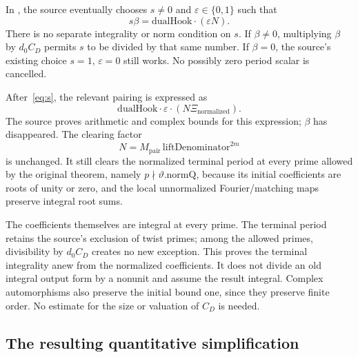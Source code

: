 In , the source eventually chooses $s\ne0$ and $\varepsilon\in\{0,1\}$ such that
\begin{equation}\label{eq:s}
 s\beta=\mathrm{dualHook}\cdot(\varepsilon N).
\end{equation}
There is no separate integrality or norm condition on $s$. If $\beta\ne0$, multiplying $\beta$ by $d_0C_D$ permits $s$ to be divided by that same number. If $\beta=0$, the source's existing choice $s=1$, $\varepsilon=0$ still works. No possibly zero period scalar is cancelled.

After~\eqref{eq:s}, the relevant pairing is expressed as
\[
 \mathrm{dualHook}\cdot\varepsilon\cdot(N\Xi_{\mathrm{normalized}}).
\]
The source proves arithmetic and complex bounds for this expression; $\beta$ has disappeared. The clearing factor
\[
 N=M_{\mathrm{pair}}\,\mathrm{liftDenominator}^{2m}
\]
is unchanged. It still clears the normalized terminal period at every prime allowed by the original theorem, namely $p\nmid\vartheta.\mathrm{normQ}$, because its initial coefficients are roots of unity or zero, and the local unnormalized Fourier/matching maps preserve integral root sums.

The coefficients themselves are integral at every prime. The terminal period retains the source's exclusion of twist primes; among the allowed primes, divisibility by $d_0C_D$ creates no new exception. This proves the terminal integrality anew from the normalized coefficients. It does not divide an old integral output form by a nonunit and assume the result integral. Complex automorphisms also preserve the initial bound one, since they preserve finite order. No estimate for the size or valuation of $C_D$ is needed.

\subsection{The resulting quantitative simplification}

